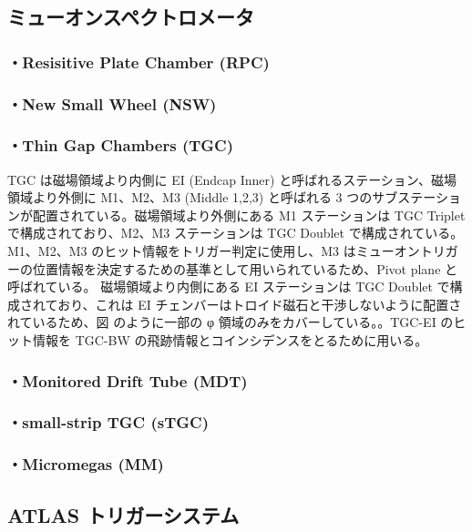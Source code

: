 \subsection{ミューオンスペクトロメータ}
\label{section2-2-4}

\subsubsection{・Resisitive Plate Chamber (RPC)}
\subsubsection{・New Small Wheel (NSW)}
\subsubsection{・Thin Gap Chambers (TGC)}
TGC は磁場領域より内側に EI (Endcap Inner) と呼ばれるステーション、磁場領域より外側に M1、M2、M3 (Middle 1,2,3) と呼ばれる 3 つのサブステーションが配置されている。磁場領域より外側にある M1 ステーションは TGC Triplet で構成されており、M2、M3 ステーションは TGC Doublet で構成されている。
M1、M2、M3 のヒット情報をトリガー判定に使用し、M3 はミューオントリガーの位置情報を決定するための基準として用いられているため、Pivot plane と呼ばれている。
磁場領域より内側にある EI ステーションは TGC Doublet で構成されており、これは EI チェンバーはトロイド磁石と干渉しないように配置されているため、図  のように一部の φ 領域のみをカバーしている。。TGC-EI のヒット情報を TGC-BW の飛跡情報とコインシデンスをとるために用いる。

\subsubsection{・Monitored Drift Tube (MDT)}
\subsubsection{・small-strip TGC (sTGC)}
\subsubsection{・Micromegas (MM)}


\subsection{ATLAS トリガーシステム}
